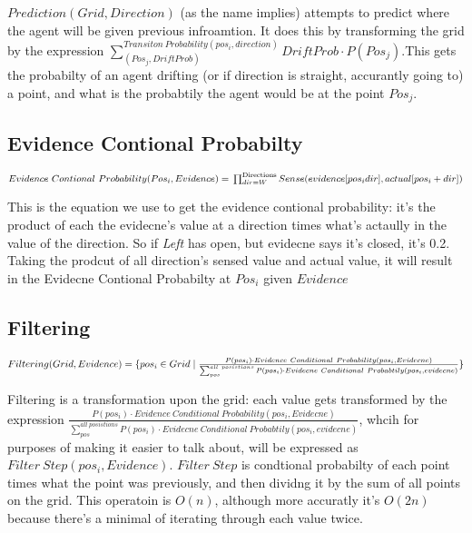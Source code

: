 \documentclass[11pt]{article}
\begin{document}
\(Prediction(Grid, Direction)\) (as the name implies) attempts to predict where the agent will be given previous infroamtion. It does this by transforming the grid by the expression  \(\sum^{Transiton\ Probability(pos_i, direction)}_{(Pos_j, DriftProb)} DriftProb \cdot P(Pos_j)\).This gets the probabilty of an agent drifting (or if direction is straight, accurantly going to) a point, and what is the probabtily the agent would be at the point \(Pos_j\).


\subsection{Evidence Contional Probabilty}
\label{sec:org7a00100}
   \begin{math}
  Evidence\ Contional\ Probability(Pos_i, Evidence)= \\
  \prod^{\text{Directions} }_{dir=W} Sense(evidence[pos_i dir], actual[pos_i+dir])
\end{math}

This is the equation we use to get the evidence contional probability: it's the product of each the evidecne's value at a direction times what's actaully in the value of the direction. So if \emph{Left} has open, but evidecne says it's closed, it's 0.2. Taking the prodcut of all direction's sensed value and actual value, it will result in the Evidecne Contional Probabilty at \(Pos_i\) given \(Evidence\)

\subsection{Filtering}
\label{sec:org85a6ac9}


   \begin{math}
Filtering(Grid, Evidence) = \{pos_i \in Grid \mid\\
\frac{P(pos_i) \cdot Evidence\ Conditional\ Probability(pos_i, Evidecne) }{\sum^{all\ posistions}_{pos} P(pos_i) \cdot Evidecne\ Conditional\ Probabtily(pos_i, evidecne) } \}
\end{math}



Filtering is a transformation upon the grid: each value gets transformed by the expression \(\frac{P(pos_i) \cdot Evidence\ Conditional\ Probability(pos_i, Evidecne) }{\sum^{all\ posistions}_{pos} P(pos_i) \cdot Evidecne\ Conditional\ Probabtily(pos_i, evidecne) }\), whcih for purposes of making it easier to talk about, will be expressed as \(Filter\ Step(pos_i, Evidence)\). \(Filter\ Step\) is condtional probabilty of each point times what the point was previously, and then dividng it  by the sum of all points on the grid. This operatoin is \(O(n)\), although more accuratly it's \(O(2n)\) because there's a minimal of iterating through each value twice.
\end{document}

